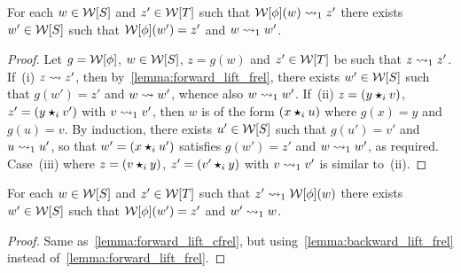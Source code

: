\begin{lemma}\label{lemma:forward_lift_cfrel}
 For each $w\in \mathcal{W}[S]$ and $z'\in\mathcal{W}[T]$ such that $\mathcal{W}[\phi](w)\leadsto_1 z'$ there exists $w'\in\mathcal{W}[S]$ such
 that $\mathcal{W}[\phi](w')=z'$ and $w\leadsto_1 w'$.
\end{lemma}
\begin{proof}
 Let $g=\mathcal{W}[\phi]$, $w\in\mathcal{W}[S]$, $z=g(w)$ and $z'\in\mathcal{W}[T]$ be such that
   $z\leadsto_1 z'$. If~(i) $z\leadsto z'$, then
   by~\cref{lemma:forward_lift_frel}, there exists $w'\in\mathcal{W}[S]$ such
   that $g(w')=z'$ and $w\leadsto w'$, whence also $w\leadsto_1 w'$. If~(ii)
   $z=(y\bm{\star}_{i} v)$, $z'=(y\bm{\star}_{i} v')$ with $v\leadsto_1 v'$, then $w$
   is of the form $(x\bm{\star}_{i} u)$ where $g(x)=y$ and $g(u)=v$. By
   induction, there exists $u'\in\mathcal{W}[S]$ such that $g(u')=v'$ and
   $u\leadsto_1 u'$, so that $w'=(x\bm{\star}_{i} u')$ satisfies $g(w')=z'$ and
   $w\leadsto_1 w'$, as required. Case~(iii) where $z=(v\bm{\star}_{i} y)$,
   $z'=(v'\bm{\star}_{i} y)$ with $v\leadsto_1 v'$ is similar to~(ii).
\end{proof}
\begin{lemma}\label{lemma:backward_lift_cfrel}
 For each $w\in \mathcal{W}[S]$ and $z'\in\mathcal{W}[T]$ such that $z'\leadsto_1\mathcal{W}[\phi](w)$ there exists $w'\in\mathcal{W}[S]$ such
 that $\mathcal{W}[\phi](w')=z'$ and $w'\leadsto_1 w$.
\end{lemma}
\begin{proof}
  Same as~\cref{lemma:forward_lift_cfrel}, but using~\cref{lemma:backward_lift_frel} instead of~\cref{lemma:forward_lift_frel}.
\end{proof}
 

